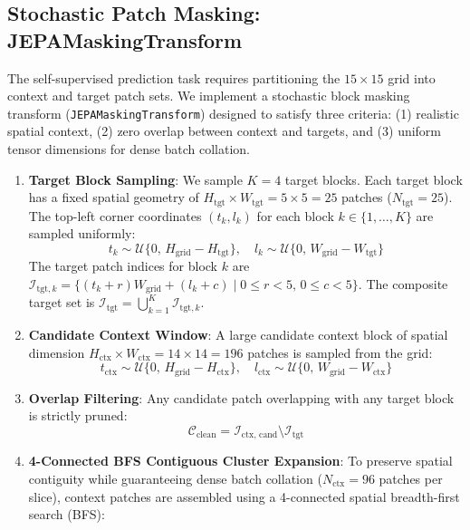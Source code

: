 \documentclass{article}
\begin{document}
\subsection{Stochastic Patch Masking: JEPAMaskingTransform}

The self-supervised prediction task requires partitioning the $15 \times 15$ grid into context and target patch sets. We implement a stochastic block masking transform (\texttt{JEPAMaskingTransform}) designed to satisfy three criteria: (1) realistic spatial context, (2) zero overlap between context and targets, and (3) uniform tensor dimensions for dense batch collation.

\begin{enumerate}
    \item \textbf{Target Block Sampling}: We sample $K = 4$ target blocks. Each target block has a fixed spatial geometry of $H_{\text{tgt}} \times W_{\text{tgt}} = 5 \times 5 = 25$ patches ($N_{\text{tgt}} = 25$). The top-left corner coordinates $(t_k, l_k)$ for each block $k \in \{1, \dots, K\}$ are sampled uniformly:
    \begin{equation}
        t_k \sim \mathcal{U}\{0, \, H_{\text{grid}} - H_{\text{tgt}}\}, \quad l_k \sim \mathcal{U}\{0, \, W_{\text{grid}} - W_{\text{tgt}}\}
    \end{equation}
    The target patch indices for block $k$ are $\mathcal{I}_{\text{tgt}, k} = \{ (t_k + r) W_{\text{grid}} + (l_k + c) \mid 0 \le r < 5, \, 0 \le c < 5 \}$. The composite target set is $\mathcal{I}_{\text{tgt}} = \bigcup_{k=1}^K \mathcal{I}_{\text{tgt}, k}$.
    \item \textbf{Candidate Context Window}: A large candidate context block of spatial dimension $H_{\text{ctx}} \times W_{\text{ctx}} = 14 \times 14 = 196$ patches is sampled from the grid:
    \begin{equation}
        t_{\text{ctx}} \sim \mathcal{U}\{0, \, H_{\text{grid}} - H_{\text{ctx}}\}, \quad l_{\text{ctx}} \sim \mathcal{U}\{0, \, W_{\text{grid}} - W_{\text{ctx}}\}
    \end{equation}
    \item \textbf{Overlap Filtering}: Any candidate patch overlapping with any target block is strictly pruned:
    \begin{equation}
        \mathcal{C}_{\text{clean}} = \mathcal{I}_{\text{ctx, cand}} \setminus \mathcal{I}_{\text{tgt}}
    \end{equation}
    \item \textbf{4-Connected BFS Contiguous Cluster Expansion}: To preserve spatial contiguity while guaranteeing dense batch collation ($N_{\text{ctx}} = 96$ patches per slice), context patches are assembled using a 4-connected spatial breadth-first search (BFS):

\end{enumerate}
\end{document}
